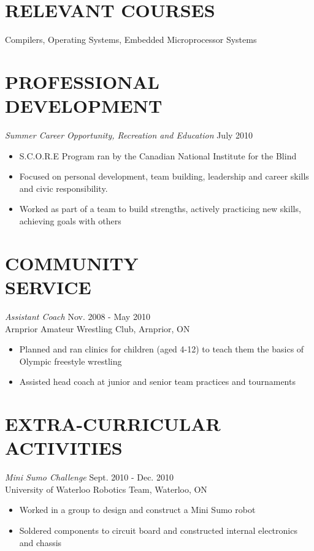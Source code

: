 \documentclass[margin]{res}
\begin{document}
\begin{resume}

\section{RELEVANT COURSES}
Compilers, Operating Systems, Embedded Microprocessor Systems

\section{PROFESSIONAL DEVELOPMENT} {\sl Summer Career Opportunity, Recreation and Education} \hfill July 2010
\begin{itemize} \itemsep -2pt
  \item S.C.O.R.E Program ran by the Canadian National Institute for the Blind
  \item Focused on personal development, team building, leadership and career skills and civic responsibility.
  \item Worked as part of a team to build strengths, actively practicing new skills, achieving goals with others
\end{itemize}

\section{COMMUNITY \\ SERVICE}  {\sl Assistant Coach} \hfill Nov. 2008 - May 2010\\
Arnprior Amateur Wrestling Club, Arnprior, ON
\begin{itemize}\itemsep -2pt
  \item Planned and ran clinics for children (aged 4-12) to teach them the basics of Olympic freestyle wrestling
  \item Assisted head coach at junior and senior team practices and tournaments
\end{itemize}

\section{EXTRA-CURRICULAR \\ ACTIVITIES}
{\it Mini Sumo Challenge}  \hfill Sept. 2010 - Dec. 2010\\
University of Waterloo Robotics Team, Waterloo, ON
\begin{itemize} \itemsep -2pt
  \item Worked in a group to design and construct a Mini Sumo robot
  \item Soldered components to circuit board and constructed internal electronics and chassis
\end{itemize}


\end{resume}
\end{document}
